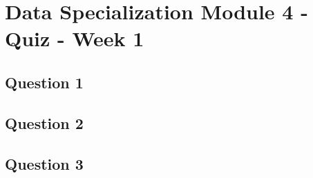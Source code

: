 \documentclass[french]{article}
\begin{document}
\section*{Data Specialization Module 4 - Quiz - Week 1}
\subsection*{Question 1}

\newpage
\subsection*{Question 2}


\newpage
\subsection*{Question 3}
\end{document}
